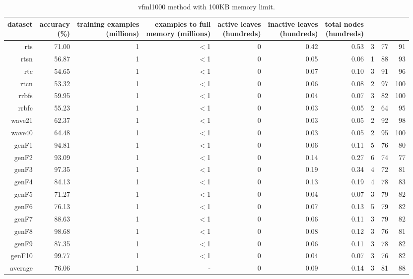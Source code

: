 \clearpage
\begin{table}
\caption{{\sc vfml1000} method with 100KB memory limit.}
\label{tab:vfml1000-100k}
\centering
\begin{tabular}{|r|r|r|r|r|r|r|r|r|r|}
\hline
dataset	&
\rotatebox{90}{\parbox{9em}{accuracy\\(\%)}} &
\rotatebox{90}{\parbox{9em}{training examples\\(millions)}} &
\rotatebox{90}{\parbox{9em}{examples to full\\memory (millions)}} &
\rotatebox{90}{\parbox{9em}{active leaves\\(hundreds)}} &
\rotatebox{90}{\parbox{9em}{inactive leaves\\(hundreds)}} &
\rotatebox{90}{\parbox{9em}{total nodes\\(hundreds)}} &
\rotatebox{90}{\parbox{9em}{tree depth}}	&
\rotatebox{90}{\parbox{9em}{training speed (\%)}} &
\rotatebox{90}{\parbox{9em}{prediction speed (\%)}} \\
\hline
{\sc rts} & 71.00 & 1 & $<$1 & 0 & 0.42 & 0.53 & 3 & 77 & 91 \\
{\sc rtsn} & 56.87 & 1 & $<$1 & 0 & 0.05 & 0.06 & 1 & 88 & 93 \\
{\sc rtc} & 54.65 & 1 & $<$1 & 0 & 0.07 & 0.10 & 3 & 91 & 96 \\
{\sc rtcn} & 53.32 & 1 & $<$1 & 0 & 0.06 & 0.08 & 2 & 97 & 100 \\
{\sc rrbfs} & 59.95 & 1 & $<$1 & 0 & 0.04 & 0.07 & 3 & 82 & 100 \\
{\sc rrbfc} & 55.23 & 1 & $<$1 & 0 & 0.03 & 0.05 & 2 & 64 & 95 \\
{\sc wave21} & 62.37 & 1 & $<$1 & 0 & 0.03 & 0.05 & 2 & 92 & 98 \\
{\sc wave40} & 64.48 & 1 & $<$1 & 0 & 0.03 & 0.05 & 2 & 95 & 100 \\
{\sc genF1} & 94.81 & 1 & $<$1 & 0 & 0.06 & 0.11 & 5 & 76 & 80 \\
{\sc genF2} & 93.09 & 1 & $<$1 & 0 & 0.14 & 0.27 & 6 & 74 & 77 \\
{\sc genF3} & 97.35 & 1 & $<$1 & 0 & 0.19 & 0.34 & 4 & 72 & 81 \\
{\sc genF4} & 84.13 & 1 & $<$1 & 0 & 0.13 & 0.19 & 4 & 78 & 83 \\
{\sc genF5} & 71.27 & 1 & $<$1 & 0 & 0.04 & 0.07 & 3 & 79 & 82 \\
{\sc genF6} & 76.13 & 1 & $<$1 & 0 & 0.07 & 0.13 & 5 & 79 & 82 \\
{\sc genF7} & 88.63 & 1 & $<$1 & 0 & 0.06 & 0.11 & 3 & 79 & 82 \\
{\sc genF8} & 98.68 & 1 & $<$1 & 0 & 0.08 & 0.12 & 3 & 76 & 81 \\
{\sc genF9} & 87.35 & 1 & $<$1 & 0 & 0.06 & 0.11 & 3 & 78 & 82 \\
{\sc genF10} & 99.77 & 1 & $<$1 & 0 & 0.04 & 0.07 & 3 & 76 & 82 \\
\hline
average & 76.06 & 1 &  -  & 0 & 0.09 & 0.14 & 3 & 81 & 88 \\
\hline
\end{tabular}
\end{table}
